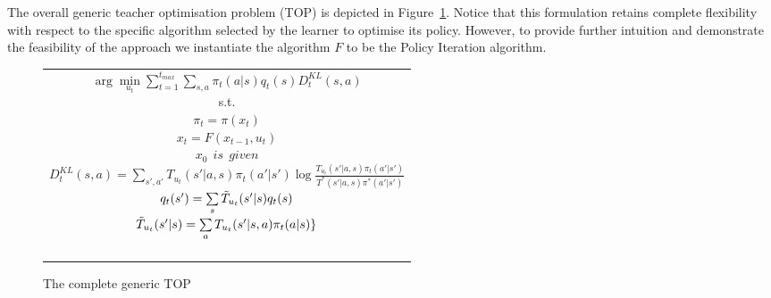 \documentclass[letterpaper]{aamas2010}
\begin{document}
The overall generic teacher optimisation problem (TOP) is depicted in
Figure~\ref{t_opt}. Notice that this formulation retains complete
flexibility with respect to the specific algorithm selected by the
learner to optimise its policy. However, to provide further intuition
and demonstrate the feasibility of the approach we instantiate the
algorithm $F$ to be the Policy Iteration algorithm.
\begin{figure}[ht]
\begin{tabular}{|c|} \hline \parbox{3.2 in} {\center 
$\arg\min\limits_{u_t}\sum\limits_{t=1}^{t_{max}}\sum\limits_{s,a}\pi_t(a|s)q_t(s)D^{KL}_t(s,a)$\\
s.t.\\
$\pi_t=\pi(x_t)$\\
$x_t=F(x_{t-1},u_t)$\\
$x_0\ \ \displaystyle{is\ \ given}$\\
$D^{KL}_t(s,a)=\sum\limits_{s',a'}T_{u_t}(s'|a,s)\pi_t(a'|s')\log\frac{T_{u_t}(s'|a,s)\pi_t(a'|s')}{T^*(s'|a,s)\pi^*(a'|s')}$\\
$q_t(s')=\sum\limits_s\Tilde{T}_{u_t}(s'|s)q_t(s)$\\
$\Tilde{T}_{u_t}(s'|s)=\sum\limits_aT_{u_t}(s'|s,a)\pi_t(a|s)\}$\\\ \\
}\\ \hline \end{tabular}
\caption{\label{t_opt}The complete generic TOP}
\end{figure}
\end{document}
